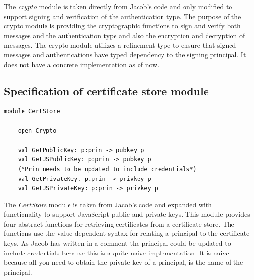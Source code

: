 \documentclass[twosided]{report}
\begin{document}
The \emph{crypto} module is taken directly from Jacob's code and only modified to support signing and verification of the authentication type. The purpose of the crypto module is providing the cryptographic functions to sign and verify both messages and the authentication type and also the encryption and decryption of messages. The crypto module utilizes a refinement type to ensure that signed messages and authentications have typed dependency to the signing principal. It does not have a concrete implementation as of now.
\subsection{Specification of certificate store module}

\begin{lstlisting}[style=fstar, caption={Abstract certificate store}]
	module CertStore
	
	open Crypto

	val GetPublicKey: p:prin -> pubkey p
	val GetJSPublicKey: p:prin -> pubkey p
	(*Prin needs to be updated to include credentials*)
	val GetPrivateKey: p:prin -> privkey p 
	val GetJSPrivateKey: p:prin -> privkey p
\end{lstlisting}

The \emph{CertStore} module is taken from Jacob's code and expanded with functionality to support JavaScript public and private keys. This module provides four abstract functions for retrieving certificates from a certificate store. The functions use the value dependent syntax for relating a principal to the certificate keys. As Jacob has written in a comment the principal could be updated to include credentials because this is a quite naive implementation. It is naive because all you need to obtain the private key of a principal, is the name of the principal.

\clearpage
\end{document}
